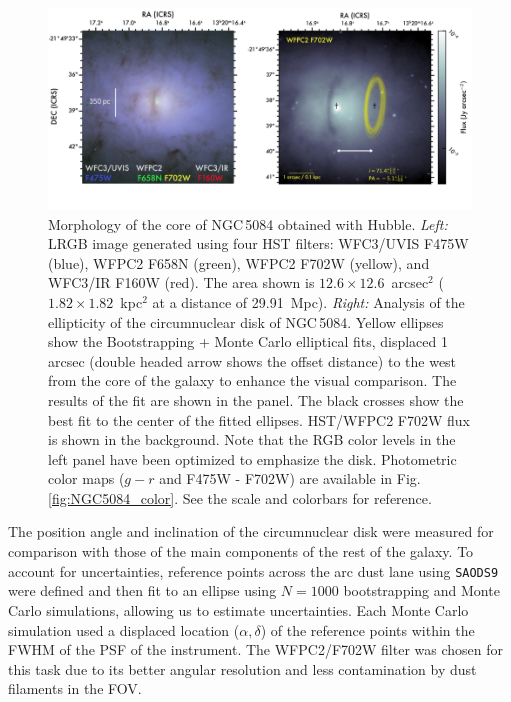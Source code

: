\documentclass[modern]{CORE-AAS/aastex631}
\begin{document}
\begin{figure}[t!]
\begin{center}
\includegraphics[trim={0 160 0 0}, clip, width=\textwidth]{FIGURES/HST_Torus_model.png}
\caption{Morphology of the core of NGC\,5084 obtained with Hubble. \emph{Left:} LRGB image generated using four HST filters: WFC3/UVIS F475W (blue), WFPC2 F658N (green), WFPC2 F702W (yellow), and WFC3/IR F160W (red). The area shown is $12.6\times12.6$~arcsec$^2$ ($1.82\times1.82$~kpc$^2$ at a distance of 29.91~Mpc). \emph{Right:} Analysis of the ellipticity of the circumnuclear disk of NGC\,5084. Yellow ellipses show the Bootstrapping + Monte Carlo elliptical fits, displaced 1 arcsec (double headed arrow shows the offset distance) to the west from the core of the galaxy to enhance the visual comparison. The results of the fit are shown in the panel. The black crosses show the best fit to the center of the fitted ellipses. HST/WFPC2 F702W flux is shown in the background. Note that the RGB color levels in the left panel have been optimized to emphasize the disk. Photometric color maps ($g-r$ and F475W - F702W) are available in Fig.\,\ref{fig:NGC5084_color}. See the scale and colorbars for reference.} 
\label{fig:NGC5084_hst}
\end{center}
\end{figure}
The position angle and inclination of the circumnuclear disk were measured for comparison with those of the main components of the rest of the galaxy. To account for uncertainties, reference points across the arc dust lane using \texttt{SAODS9} were defined and then fit to an ellipse using $N=1000$ bootstrapping and Monte Carlo simulations, allowing us to estimate uncertainties. Each Monte Carlo simulation used a displaced location ($\alpha, \delta$) of the reference points within the FWHM of the PSF of the instrument. The WFPC2/F702W filter was chosen for this task due to its better angular resolution and less contamination by dust filaments in the FOV. \par 
\end{document}
